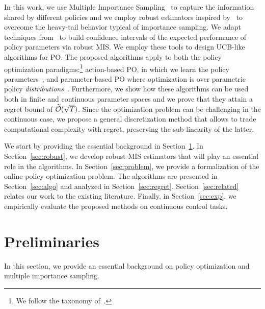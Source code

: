 \documentclass{article}
\begin{document}
In this work, we use Multiple Importance Sampling~\citep[MIS,][]{veach_optimally_1995} to capture the information shared by different policies and we employ robust estimators inspired by~\citet{bubeck2013bandits} to overcome the heavy-tail behavior typical of importance sampling. We adapt techniques from~\citet{metelli2018policy} to build confidence intervals of the expected performance of policy parameters via robust MIS.
We employ these tools to design UCB-like algorithms for PO. The proposed algorithms apply to both the policy optimization paradigms:\footnote{We follow the taxonomy of~\citet{metelli2018policy}.} action-based PO, in which we learn the policy parameters~\cite{sutton2000policy}, and parameter-based PO where optimization is over parametric policy \textit{distributions}~\cite{sehnke2008policy}. Furthermore, we show how these algorithms can be used both in finite and continuous parameter spaces and we prove that they attain a regret bound of $\widetilde{\mathcal{O}}(\sqrt{T})$. Since the optimization problem can be challenging in the continuous case, we propose a general discretization method that allows to trade computational complexity with regret, preserving the sub-linearity of the latter.

We start by providing the essential background in Section~\ref{sec:pre}. In Section~\ref{sec:robust}, we develop robust MIS estimators that will play an essential role in the algorithms. In Section~\ref{sec:problem}, we provide a formalization of the online policy optimization problem. The algorithms are presented in Section~\ref{sec:algo} and analyzed in Section~\ref{sec:regret}. Section~\ref{sec:related} relates our work to the existing literature. Finally, in Section~\ref{sec:exp}, we empirically evaluate the proposed methods on continuous control tasks.

\section{Preliminaries}\label{sec:pre}
In this section, we provide an essential background on policy optimization and multiple importance sampling.
\end{document}
